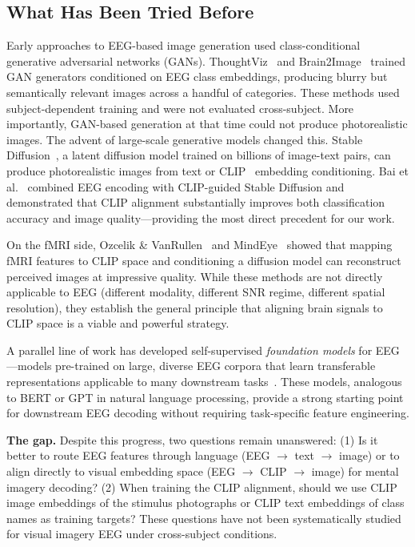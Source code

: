 \documentclass{article}
\begin{document}
\subsection{What Has Been Tried Before}

Early approaches to EEG-based image generation used class-conditional generative adversarial networks (GANs). ThoughtViz~\citep{tirupattur2018thoughtviz} and Brain2Image~\citep{kavasidis2017brain2image} trained GAN generators conditioned on EEG class embeddings, producing blurry but semantically relevant images across a handful of categories. These methods used subject-dependent training and were not evaluated cross-subject. More importantly, GAN-based generation at that time could not produce photorealistic images. The advent of large-scale generative models changed this. Stable Diffusion~\citep{rombach2022ldm}, a latent diffusion model trained on billions of image-text pairs, can produce photorealistic images from text or CLIP~\citep{radford2021clip} embedding conditioning. Bai et al.~\citep{bai2023brain} combined EEG encoding with CLIP-guided Stable Diffusion and demonstrated that CLIP alignment substantially improves both classification accuracy and image quality---providing the most direct precedent for our work.

On the fMRI side, Ozcelik \& VanRullen~\citep{ozcelik2023brain} and MindEye~\citep{scotti2024mindeye} showed that mapping fMRI features to CLIP space and conditioning a diffusion model can reconstruct perceived images at impressive quality. While these methods are not directly applicable to EEG (different modality, different SNR regime, different spatial resolution), they establish the general principle that aligning brain signals to CLIP space is a viable and powerful strategy.

A parallel line of work has developed self-supervised \emph{foundation models} for EEG---models pre-trained on large, diverse EEG corpora that learn transferable representations applicable to many downstream tasks~\citep{kostas2022bendr,jiang2024labram,zhu2024csbrain}. These models, analogous to BERT or GPT in natural language processing, provide a strong starting point for downstream EEG decoding without requiring task-specific feature engineering.

\textbf{The gap.} Despite this progress, two questions remain unanswered: (1) Is it better to route EEG features through language (EEG $\to$ text $\to$ image) or to align directly to visual embedding space (EEG $\to$ CLIP $\to$ image) for mental imagery decoding? (2) When training the CLIP alignment, should we use CLIP image embeddings of the stimulus photographs or CLIP text embeddings of class names as training targets? These questions have not been systematically studied for visual imagery EEG under cross-subject conditions.
\end{document}
